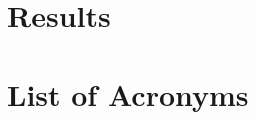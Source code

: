 \documentclass[british,11pt,a4paper]{memoir}
\begin{document}
\chapter{Results}



\chapter*{List of Acronyms}

\appendix

\backmatter



\end{document}
